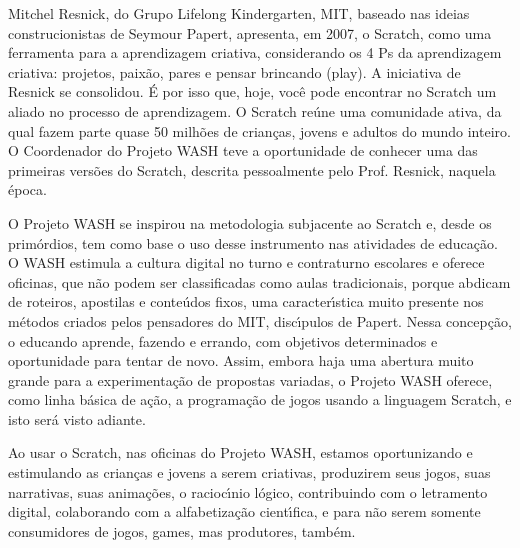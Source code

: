 \documentclass[
12pt,		%
openright,	%
twoside,  %
a4paper,			%
chapter=TITLE,		%
english,			%
french,				%
spanish,			%
brazil				%
]{USPSC-classe/USPSC}
\begin{document}
Mitchel Resnick, do Grupo Lifelong Kindergarten, MIT, baseado nas ideias construcionistas de Seymour Papert, apresenta, em 2007, o Scratch, como uma ferramenta para a aprendizagem criativa, considerando  os 4 Ps da aprendizagem criativa: projetos, paix\~ao, pares e pensar brincando (play). A  iniciativa de Resnick se consolidou. \'E por isso que, hoje, voc\^e pode encontrar no Scratch um aliado no processo de aprendizagem. O Scratch re\'une uma comunidade ativa, da qual fazem parte quase 50 milh\~oes de crian\c{c}as, jovens e adultos do mundo inteiro. O Coordenador do Projeto WASH teve a oportunidade de conhecer uma das primeiras vers\~oes do Scratch, descrita pessoalmente pelo Prof. Resnick, naquela \'epoca.










O Projeto WASH se inspirou na metodologia subjacente ao Scratch e, desde os prim\'ordios, tem como base o uso desse instrumento nas atividades de educa\c{c}\~ao. O WASH estimula a cultura digital no turno e contraturno escolares e oferece oficinas, que n\~ao podem ser classificadas como aulas tradicionais, porque abdicam de roteiros, apostilas e conte\'udos fixos, uma caracter\'{\i}stica muito presente nos m\'etodos criados pelos pensadores do MIT, disc\'{\i}pulos de Papert. Nessa concep\c{c}\~ao, o educando aprende, fazendo e errando, com objetivos determinados e oportunidade para tentar de novo. Assim, embora haja uma abertura muito grande para a experimenta\c{c}\~ao de propostas variadas, o Projeto WASH oferece, como linha b\'asica de a\c{c}\~ao, a programa\c{c}\~ao de jogos usando a linguagem Scratch, e isto ser\'a visto adiante.










Ao usar o Scratch, nas oficinas do Projeto WASH, estamos oportunizando e estimulando \textquotedbl as crian\c{c}as e jovens a serem criativas, produzirem seus jogos, suas narrativas, suas anima\c{c}\~oes, o racioc\'{\i}nio l\'ogico, contribuindo com o letramento digital, colaborando com a alfabetiza\c{c}\~ao cient\'{\i}fica, e para n\~ao serem somente consumidores de jogos, games, mas produtores, tamb\'em\textquotedbl .
\end{document}
